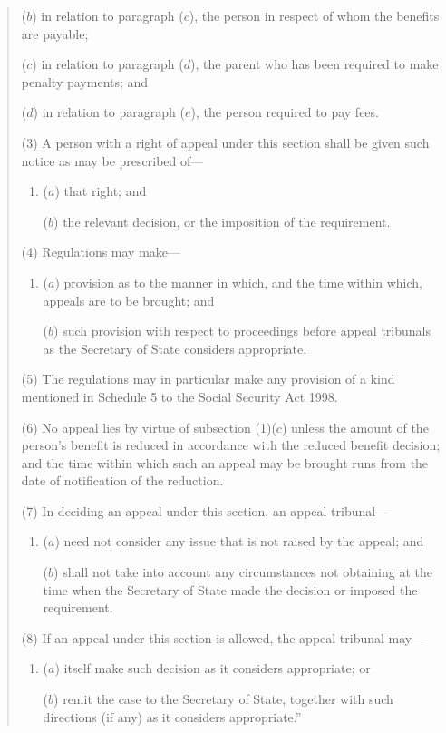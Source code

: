 \documentclass[12pt,a4paper]{article}
\begin{document}
\begin{quotation}
\begin{enumerate}
($b$) in relation to paragraph ($c$), the person in respect of whom the benefits are payable;

($c$) in relation to paragraph ($d$), the parent who has been required to make penalty payments; and

($d$) in relation to paragraph ($e$), the person required to pay fees.
\end{enumerate}

(3) A person with a right of appeal under this section shall be given such notice as may be prescribed of—
\begin{enumerate}\item[]
($a$) that right; and

($b$) the relevant decision, or the imposition of the requirement.
\end{enumerate}

(4) Regulations may make—
\begin{enumerate}\item[]
($a$) provision as to the manner in which, and the time within which, appeals are to be brought; and

($b$) such provision with respect to proceedings before appeal tribunals as the Secretary of State considers appropriate.
\end{enumerate}

(5) The regulations may in particular make any provision of a kind mentioned in Schedule 5 to the Social Security Act 1998. 

(6) No appeal lies by virtue of subsection (1)($c$)  unless the amount of the person’s benefit is reduced in accordance with the reduced benefit decision; and the time within which such an appeal may be brought runs from the date of notification of the reduction.

(7) In deciding an appeal under this section, an appeal tribunal—
\begin{enumerate}\item[]
($a$) need not consider any issue that is not raised by the appeal; and

($b$) shall not take into account any circumstances not obtaining at the time when the Secretary of State made the decision or imposed the requirement.
\end{enumerate}

(8) If an appeal under this section is allowed, the appeal tribunal may—
\begin{enumerate}\item[]
($a$) itself make such decision as it considers appropriate; or

($b$) remit the case to the Secretary of State, together with such directions (if any) as it considers appropriate.”
\end{enumerate}
\end{quotation}
\end{document}
